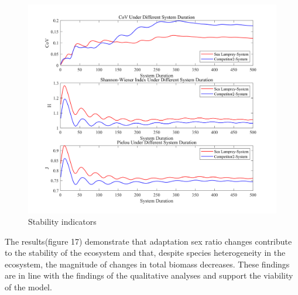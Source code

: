 \documentclass[12pt]{article}  %
\begin{document}
 \begin{figure}[htbp]  %
	\centering  %
	\includegraphics[width=.9\textwidth]{img/lam.png} %
	\caption{Stability indicators} %
\end{figure}
\vspace{-0.8cm}
\par
The results(figure 17) demonstrate that adaptation sex ratio changes contribute to the stability of the ecosystem and that, despite species heterogeneity in the ecosystem, the magnitude of changes in total biomass decreases. These findings are in line with the findings of the qualitative analyses and support the viability of the model.\par
\end{document}
